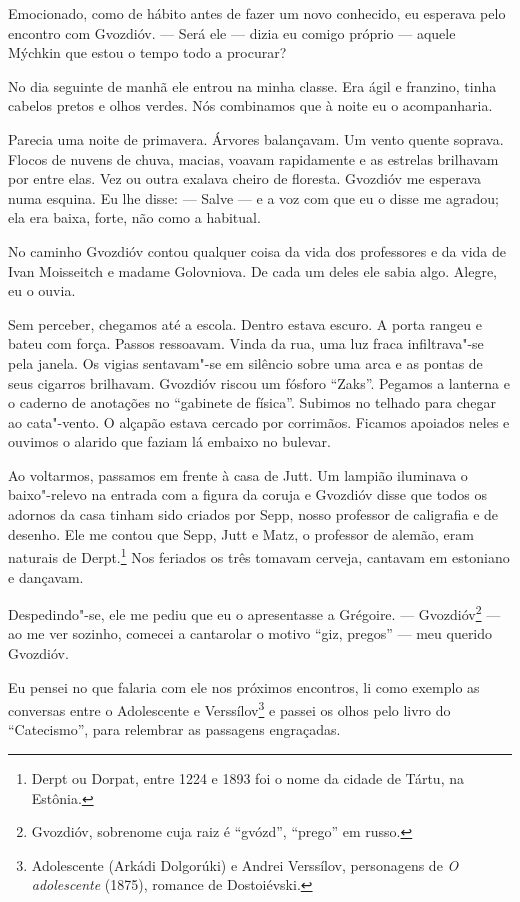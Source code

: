 Emocionado, como de hábito antes de fazer um novo conhecido, eu esperava
pelo encontro com Gvozdióv. --- Será ele --- dizia eu comigo próprio ---
aquele Mýchkin que estou o tempo todo a procurar?

No dia seguinte de manhã ele entrou na minha classe. Era ágil e
franzino, tinha cabelos pretos e olhos verdes. Nós combinamos que à
noite eu o acompanharia.

Parecia uma noite de primavera. Árvores balançavam. Um vento quente
soprava. Flocos de nuvens de chuva, macias, voavam rapidamente e as
estrelas brilhavam por entre elas. Vez ou outra exalava cheiro de
floresta. Gvozdióv me esperava numa esquina. Eu lhe disse: --- Salve ---
e a voz com que eu o disse me agradou; ela era baixa, forte, não como a
habitual.

No caminho Gvozdióv contou qualquer coisa da vida dos professores e da
vida de Ivan Moisseitch e madame Golovniova. De cada um deles ele sabia
algo. Alegre, eu o ouvia.

Sem perceber, chegamos até a escola. Dentro estava escuro. A porta
rangeu e bateu com força. Passos ressoavam. Vinda da rua, uma luz fraca
infiltrava"-se pela janela. Os vigias sentavam"-se em silêncio sobre uma
arca e as pontas de seus cigarros brilhavam. Gvozdióv riscou um fósforo
``Zaks''. Pegamos a lanterna e o caderno de anotações no ``gabinete de
física''. Subimos no telhado para chegar ao cata"-vento. O alçapão estava
cercado por corrimãos. Ficamos apoiados neles e ouvimos o alarido que
faziam lá embaixo no bulevar.

Ao voltarmos, passamos em frente à casa de Jutt. Um lampião iluminava o
baixo"-relevo na entrada com a figura da coruja e Gvozdióv disse que
todos os adornos da casa tinham sido criados por Sepp, nosso professor
de caligrafia e de desenho. Ele me contou que Sepp, Jutt e Matz, o
professor de alemão, eram naturais de Derpt.\footnote{Derpt ou Dorpat,
  entre 1224 e 1893 foi o nome da cidade de Tártu, na Estônia.} Nos
feriados os três tomavam cerveja, cantavam em estoniano e dançavam.

Despedindo"-se, ele me pediu que eu o apresentasse a Grégoire. ---
Gvozdióv\footnote{Gvozdióv, sobrenome cuja raiz é ``gvózd'', ``prego''
  em russo.} --- ao me ver sozinho, comecei a cantarolar o motivo ``giz,
pregos'' --- meu querido Gvozdióv.

Eu pensei no que falaria com ele nos próximos encontros, li como exemplo
as conversas entre o Adolescente e Verssílov\footnote{Adolescente
  (Arkádi Dolgorúki) e Andrei Verssílov, personagens de \emph{O
  adolescente} (1875), romance de Dostoiévski.} e passei os olhos pelo
livro do ``Catecismo'', para relembrar as passagens engraçadas.

